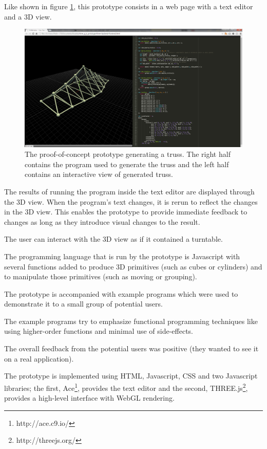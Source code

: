 \documentclass{./llncs2e/llncs}
\begin{document}
	Like shown in figure \ref{fig:proto:3d:p:editor}, this prototype consists in a web page with a text editor and a 3D view.

	\begin{figure}
	  \centering
	  \includegraphics[width=1.0\textwidth]{img/proto_3d_p_editor}
	    \caption{The proof-of-concept prototype generating a truss. The right half contains the program used to generate the truss and the left half contains an interactive view of generated truss.}
	  \label{fig:proto:3d:p:editor}
	\end{figure} 

	The results of running the program inside the text editor are displayed through the 3D view. When the program's text changes, it is rerun to reflect the changes in the 3D view. This enables the prototype to provide immediate feedback to changes as long as they introduce visual changes to the result.

	The user can interact with the 3D view as if it contained a turntable.

	The programming language that is run by the prototype is Javascript with several functions added to produce 3D primitives (such as cubes or cylinders) and to manipulate those primitives (such as moving or grouping).

	The prototype is accompanied with example programs which were used to demonstrate it to a small group of potential users.

	The example programs try to emphasize functional programming techniques like using higher-order functions and minimal use of side-effects.

	The overall feedback from the potential users was positive (they wanted to see it on a real application).

	The prototype is implemented using HTML, Javascript, CSS and two Javascript libraries; the first, Ace\footnote{http://ace.c9.io/}, provides the text editor and the second, THREE.js\footnote{http://threejs.org/}, provides a high-level interface with WebGL rendering.
\end{document}
